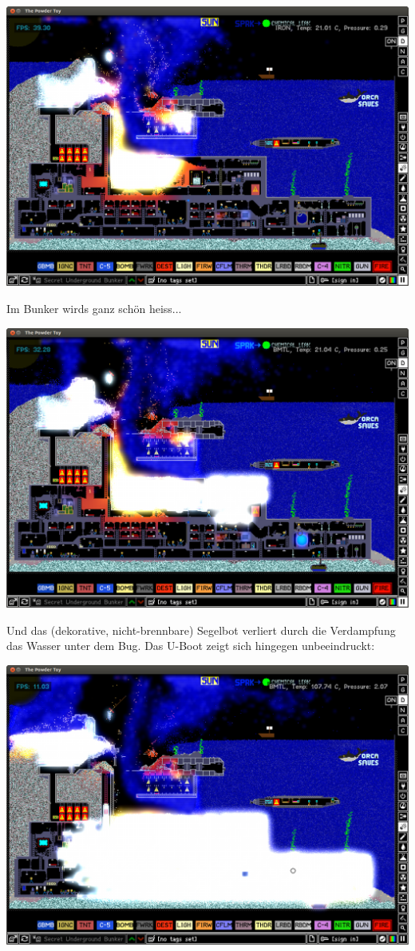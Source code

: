\begin{multicols}{2}
\begin{center}
\includegraphics[width=\linewidth]{powdertoy/powdertoy-bu7.png}
\end{center}
Im Bunker wirds ganz schön heiss...
\begin{center}
\includegraphics[width=\linewidth]{powdertoy/powdertoy-bu8.png}
\end{center}
Und das (dekorative, nicht-brennbare) Segelbot verliert durch die Verdampfung das Wasser unter dem Bug. Das U-Boot zeigt sich hingegen unbeeindruckt:
\begin{center}
\includegraphics[width=\linewidth]{powdertoy/powdertoy-bu9.png}

\end{center}
\end{multicols}
